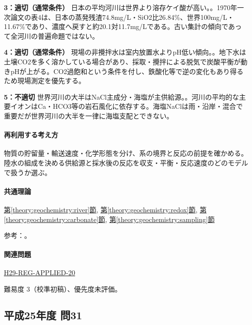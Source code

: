 \noindent\textbf{3：適切（通常条件）} 日本の平均河川は世界より溶存ケイ酸が高い。。1970年一次論文の表4は、日本の蒸発残渣74.8mg/L・SiO2比26.84\%、世界100mg/L・11.67\%であり、濃度へ戻すと約20.1対11.7mg/Lである。古い集計の傾向であって全河川の普遍命題ではない。\par

\noindent\textbf{4：適切（通常条件）} 現場の非攪拌水は室内放置水よりpH低い傾向。。地下水は土壌CO2を多く溶かしている場合があり、採取・攪拌による脱気で炭酸平衡が動きpHが上がる。CO2過飽和という条件を付し、鉄酸化等で逆の変化もあり得るため現場測定を優先する。\par

\noindent\textbf{5：不適切} 世界河川の大半はNaCl主成分・海塩が主供給源。。河川の平均的な主要イオンはCa・HCO3等の岩石風化に依存する。海塩NaClは雨・沿岸・混合で重要だが世界河川の大半を一律に海塩支配とできない。\par

\paragraph{再利用する考え方} 物質の貯留量・輸送速度・化学形態を分け、系の境界と反応の前提を確かめる。陸水の組成を決める供給源と採水後の反応を収支・平衡・反応速度のどのモデルで扱うか選ぶ。

\paragraph{共通理論} \hyperref[theory:geochemistry:river]{第\ref*{theory:geochemistry:river}節}, \hyperref[theory:geochemistry:redox]{第\ref*{theory:geochemistry:redox}節}, \hyperref[theory:geochemistry:carbonate]{第\ref*{theory:geochemistry:carbonate}節}, \hyperref[theory:geochemistry:sampling]{第\ref*{theory:geochemistry:sampling}節}

\par 参考：\cite{gc_river1970,gc_hem,gc_redox,gc_mine}。

\paragraph{関連問題} \hyperref[q:h29-reg-applied-20]{H29-REG-APPLIED-20}

\par 難易度 3（校準初稿）、優先度未評価。

\subsection{平成25年度 問31}
\label{q:h25-reg-applied-31}

